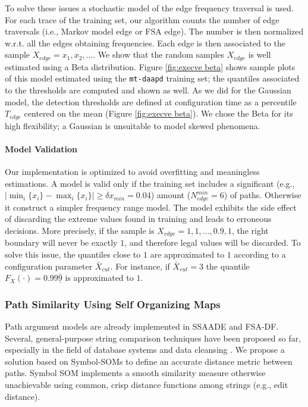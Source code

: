 To solve these issues a stochastic model of the edge frequency traversal is used. For each trace of the training set, our algorithm counts the number of edge traversals (i.e., Markov model edge or \ac{FSA} edge). The number is then normalized w.r.t. all the edges obtaining frequencies. Each edge is then associated to the sample $X_{edge} = x_{1}, x_{2}, \dots$. We show that the random samples $X_{edge}$ is well estimated using a Beta distribution. Figure \ref{fig:execve beta} shows sample plots of this model estimated using the \texttt{mt-daapd} training set; the quantiles associated to the thresholds are computed and shown as well. As we did for the Gaussian model, the detection thresholds are defined at configuration time as a percentile $T_{edge}$ centered on the mean (Figure \ref{fig:execve beta}). We chose the Beta for its high flexibility; a Gaussian is unsuitable to model skewed phenomena.

\paragraph{Model Validation} Our implementation is optimized to avoid
overfitting and meaningless estimations. A model is
valid only if the training set includes a significant (e.g.,
$|\min_{i}\{x_{i}\} - \max_{i}\{x_{i}\}| \geq \delta x_{min} = 0.04$)
amount ($N_{edge}^{min} = 6$) of paths. Otherwise it construct a
simpler frequency range model. The model exhibits the side effect of
discarding the extreme values found in training and leads to erroneous
decisions. More precisely, if the sample is $X_{edge} = 1, 1, \dots,
0.9, 1$, the right boundary will never be exactly $1$, and therefore
legal values will be discarded. To solve this issue, the quantiles
close to $1$ are approximated to $1$ according to a configuration
parameter $\bar{X}_{cut}$. For instance, if $\bar{X}_{cut} = 3$ the
quantile $F_{X}(\cdot) = 0.99\underline{\bar{9}}$ is approximated to
$1$.

\subsubsection{Path Similarity Using Self Organizing Maps}
\label{host:improving:path-model}
Path argument models are already implemented in \ac{SSAADE} and FSA-DF. Several, general-purpose string comparison techniques have been proposed so far, especially in the field of database systems and data cleansing \citep{elmagarmid2007drd}. We propose a solution based on Symbol-\acp{SOM} \citep{symbolsom_online} to define an accurate distance metric between paths. Symbol \ac{SOM} implements a smooth similarity measure otherwise unachievable using common, crisp distance functions among strings (e.g., edit distance).

